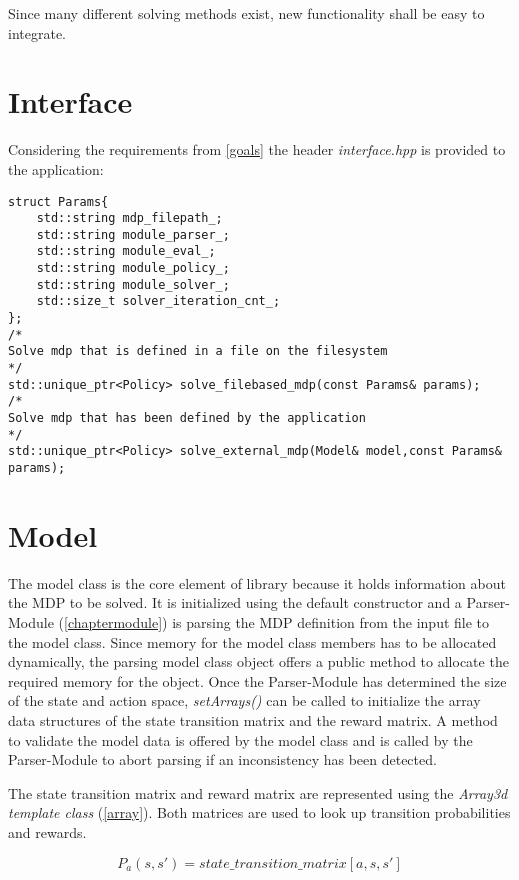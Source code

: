 Since many different solving methods exist, new functionality shall be easy to integrate.

\section{Interface}

Considering the requirements from \autoref{goals} the header \emph{interface.hpp} is provided to the application:

\begin{lstlisting}
struct Params{
	std::string mdp_filepath_;
	std::string module_parser_;
	std::string module_eval_;
	std::string module_policy_;
	std::string module_solver_;
	std::size_t solver_iteration_cnt_;
};
/*
Solve mdp that is defined in a file on the filesystem
*/
std::unique_ptr<Policy> solve_filebased_mdp(const Params& params);
/*
Solve mdp that has been defined by the application
*/
std::unique_ptr<Policy> solve_external_mdp(Model& model,const Params& params);

\end{lstlisting}


\section{Model}

The model class is the core element of library because it holds information about the MDP to be solved. It is initialized using the default constructor and a Parser-Module (\autoref{chaptermodule}) is parsing the MDP definition from the input file to the model class. Since memory for the model class members has to be allocated dynamically, the parsing model class object offers a public method to allocate the required memory for the object. Once the Parser-Module has determined the size of the state and action space, \emph{setArrays()} can be called to initialize the array data structures of the state transition matrix and the reward matrix. A method to validate the model data is offered by the model class and is called by the Parser-Module to abort parsing if an inconsistency has been detected. 

The state transition matrix and reward matrix are represented using the \emph{Array3d template class} (\autoref{array}).
Both matrices are used to look up transition probabilities and rewards.

\begin{equation}
P_a(s,s') = state\_transition\_matrix[a,s,s']
\end{equation}

